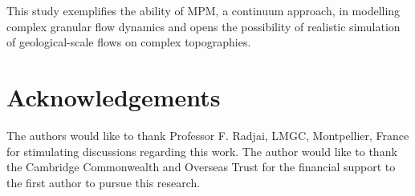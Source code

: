 \documentclass[3p,times,procedia,number]{elsarticle}
\begin{document}
This study exemplifies the ability of MPM, a continuum approach,  in modelling 
complex granular flow dynamics and opens the possibility of realistic 
simulation of geological-scale flows on complex topographies.

\section*{Acknowledgements}
The authors would like to thank Professor F. Radjai, LMGC, Montpellier, France for stimulating discussions regarding this work. The author would like to thank the Cambridge Commonwealth and Overseas Trust for the financial support to the first author to pursue this research. 


 
\end{document}
